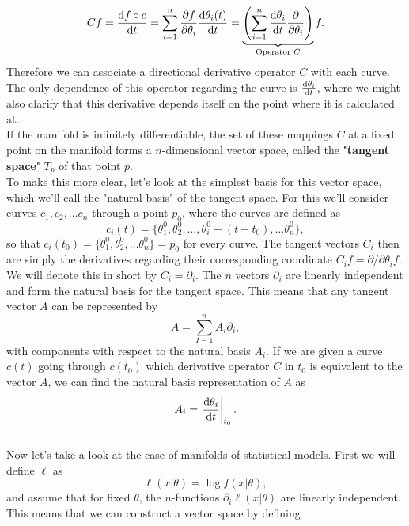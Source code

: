 \begin{equation}
	Cf = \frac{\mathrm{d}f\circ c}{\mathrm{d}t} = \sum_{i=1}^{n} \frac{\partial f}{\partial\theta_i}\frac{\mathrm{d}\theta_i(t)}{\mathrm{d}t} = \underbrace{\left(\sum_{i=1}^{n}\frac{\mathrm{d}\theta_i}{\mathrm{d}t}\frac{\partial}{\partial\theta_i}\right)}_{\text{Operator }C} f.
\end{equation}
Therefore we can associate a directional derivative operator $C$ with each curve. The only dependence of this operator regarding the curve is $\frac{\mathrm{d}\theta_i}{\mathrm{d}t}$, where we might also clarify that this derivative depends itself on the point where it is calculated at.\\
If the manifold is infinitely differentiable, the set of these mappings $C$ at a fixed point on the manifold forms a $n$-dimensional vector space, called the "\textbf{tangent space}" $T_p$ of that point $p$. \\
To make this more clear, let's look at the simplest basis for this vector space, which we'll call the "natural basis" of the tangent space. For this we'll consider curves $c_1,c_2, \dotsc c_n$ through a point $p_0$, where the curves are defined as 
\begin{equation}
	c_i(t) = \{\theta_1^0,\theta_2^0, \dotsc, \theta_i^0 + (t-t_0), \dotsc \theta_n^0 \},
\end{equation}
so that $c_i(t_0) = \{\theta_1^0,\theta_2^0, \dotsc\theta_n^0\} = p_0$ for every curve. The tangent vectors $C_i$ then are simply the derivatives regarding their corresponding coordinate $C_i f = \partial/\partial \theta_i f$. We will denote this in short by $C_i = \partial_i$. The $n$ vectors $\partial_i$ are linearly independent and form the natural basis for the tangent space. This means that any tangent vector $A$ can be represented by 
\begin{equation}
	A = \sum_{I=1}^{n} A_i \partial_i,
\end{equation}
with components with respect to the natural basis $A_i$. If we are given a curve $c(t)$ going through $c(t_0)$ which derivative operator $C$ in $t_0$ is equivalent to the vector $A$, we can find the natural basis representation of $A$ as
\begin{equation}
	A_i = \left. \frac{\mathrm{d}\theta_i}{\mathrm{d}t}\right|_{t_0}.
\end{equation} \\
Now let's take a look at the case of manifolds of statistical models. First we will define $\ell$ as
\begin{equation}
	\ell(x|\theta) = \log f(x|\theta),
\end{equation}
and assume that for fixed $\theta$, the $n$-functions $\partial_i \ell(x|\theta)$ are linearly independent. This means that we can construct a vector space by defining
